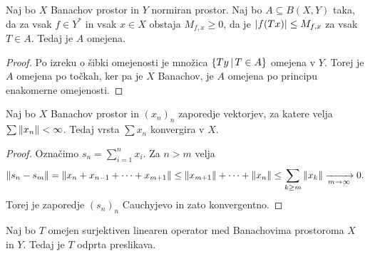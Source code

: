 \begin{posledica}
  Naj bo $X$ Banachov prostor in $Y$ normiran prostor.
  Naj bo $A \subseteq B(X,Y)$ taka, da za vsak $f \in Y^*$ in vsak $x \in X$
  obstaja $M_{f,x} \ge 0$, da je $\left| f(Tx) \right| \le M_{f,x}$ za vsak $T \in A$.
  Tedaj je $A$ omejena.
\end{posledica}

\begin{proof}
  Po izreku o šibki omejenosti je množica $\{Ty \,|\, T \in A\}$ omejena v $Y$.
  Torej je $A$ omejena po točkah, ker pa je $X$ Banachov, je $A$ omejena po
  principu enakomerne omejenosti.
\end{proof}

\begin{lema}
  Naj bo $X$ Banachov prostor in $(x_n)_n$ zaporedje vektorjev, za katere velja
  $\sum \left\lVert x_n\right\rVert < \infty$.
  Tedaj vrsta $\sum x_n$ konvergira v $X$.
\end{lema}

\begin{proof}
  Označimo $s_n = \sum_{i=1}^n x_i$.
  Za $n > m$ velja
  \[
	\left\lVert s_n - s_m\right\rVert = \left\lVert x_n + x_{n-1} + \cdots + x_{m+1}\right\rVert
	\le \left\lVert x_{m+1}\right\rVert + \cdots + \left\lVert x_n\right\rVert
	\le \sum_{k \ge m} \left\lVert x_k\right\rVert
	\xrightarrow[m \to \infty]{} 0.
  \]
  Torej je zaporedje $(s_n)_n$ Cauchyjevo in zato konvergentno.
\end{proof}

\begin{izrek}
  Naj bo $T$ omejen surjektiven linearen operator med Banachovima prostoroma $X$
  in $Y$.
  Tedaj je $T$ odprta preslikava.
\end{izrek}

